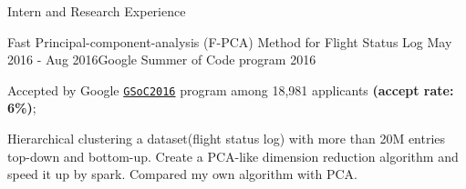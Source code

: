 \documentclass{resume} %
\begin{document}
\begin{rSection}{Intern and Research Experience}
\begin{rSubsection}{Fast Principal-component-analysis (F-PCA) Method for Flight Status Log} {May 2016 - Aug 2016}{Google Summer of Code program 2016}{}
\item Accepted by Google \href{https://developers.google.com/open-source/gsoc/}{\texttt{GSoC2016}}  program among 18,981 applicants \textbf{(accept rate: 6\%)};
\item Hierarchical clustering a dataset(flight status log) with more than 20M entries top-down and bottom-up. Create a PCA-like dimension reduction algorithm and speed it up by spark. Compared my own algorithm with PCA.
\end{rSubsection}  




\end{rSection}



\end{document}
